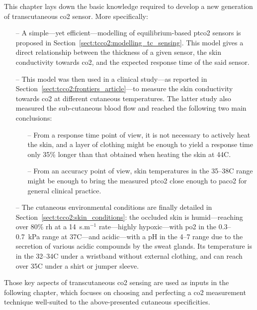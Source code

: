This chapter lays down the basic knowledge required to develop a new generation of transcutaneous \gls{co2} sensor. More specifically:
\begin{itemize}
	\item[--] A simple---yet efficient---modelling of equilibrium-based \gls{ptco2} sensors is proposed in Section~\ref{sect:tcco2:modelling_tc_sensing}. This model gives a direct relationship between the thickness of a given sensor, the skin conductivity towards \gls{co2}, and the expected response time of the said sensor.
	\item[--] This model was then used in a clinical study---as reported in Section~\ref{sect:tcco2:frontiers_article}---to measure the skin conductivity towards \gls{co2} at different cutaneous temperatures. The latter study also measured the sub-cutaneous blood flow and reached the following two main conclusions:
	\begin{itemize}
		\item[--] From a response time point of view, it is not necessary to actively heat the skin, and a layer of clothing might be enough to yield a response time only 35\% longer than that obtained when heating the skin at 44{\degree}C.
		\item[--] From an accuracy point of view, skin temperatures in the 35--38{\degree}C range might be enough to bring the measured \gls{ptco2} close enough to \gls{paco2} for general clinical practice.
	\end{itemize}
	\item[--] The cutaneous environmental conditions are finally detailed in Section~\ref{sect:tcco2:skin_conditions}: the occluded skin is humid---reaching over 80\% \gls{rh} at a 14~s.{\textmu}m$^{-1}$ rate---highly hypoxic---with \gls{po2} in the 0.3--0.7~kPa range at 37{\degree}C---and acidic---with a pH in the 4--7 range due to the secretion of various acidic compounds by the sweat glands. Its temperature is in the 32--34{\degree}C under a wristband without external clothing, and can reach over 35{\degree}C under a shirt or jumper sleeve.
\end{itemize}

Those key aspects of transcutaneous \gls{co2} sensing are used as inputs in the following chapter, which focuses on choosing and perfecting a \gls{co2} measurement technique well-suited to the above-presented cutaneous specificities.
